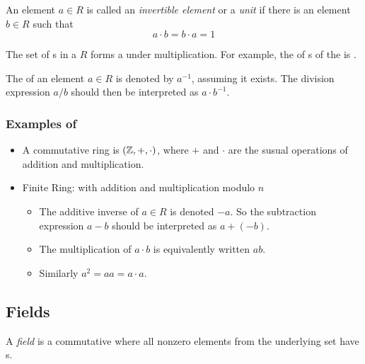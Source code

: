\begin{definition}\label{def:Invertible_Element}
  An element $a \in R$ is called an \emph{invertible element} or a \emph{unit} if there is an element $b \in R$ such that
  \begin{equation}\label{eq:Invertible_Element}
    a \cdot b = b \cdot a = 1
  \end{equation}

  \begin{remark}
    The set of s in a  $R$ forms a  under multiplication.
    For example, the  of s of the  \TextIntsModN{} is \TextMultiplicativeGroupN{}.
  \end{remark}
  
  \begin{remark}\label{rmk:Ring_Multiplicative_Inverse}
    The  of an element $a \in R$ is denoted by $a^{-1}$, assuming it exists.
    The division expression $a/b$ should then be interpreted as $a \cdot b^{-1}$.
  \end{remark}
\end{definition}

\subsubsection{Examples of }\label{subsubsec:Examples_of_Rings}
\begin{itemize}[noitemsep]
\item A commutative ring is $(\operatorname{\mathbb{Z}}, +, \cdot)$, where $+$ and $\cdot$ are the susual operations of addition and multiplication.
\item Finite Ring: \TextIntsModN{} with addition and multiplication modulo $n$
  \begin{itemize}[noitemsep]
  \item The additive inverse of $a \in R$ is denoted $-a$. So the subtraction expression $a-b$ should be interpreted as $a + (-b)$.
  \item The multiplication of $a \cdot b$ is equivalently written $ab$.
  \item Similarly $a^{2} = aa = a \cdot a$.
  \end{itemize}
\end{itemize}

\subsection{Fields}\label{subsec:Fields}
\begin{definition}[Field]\label{def:Field}
  A \emph{field} is a commutative  where all nonzero elements from the underlying set have s.
\end{definition}

